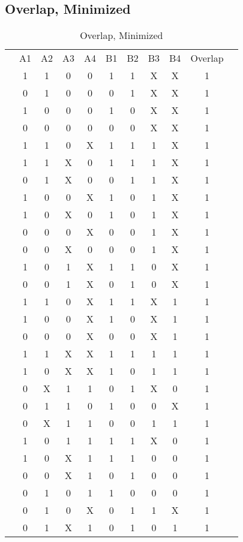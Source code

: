 \documentclass[letterpaper,titlepage,oneside]{article}
\begin{document}
\pagebreak
\subsection*{Overlap, Minimized}
\begin{table}['h']
\begin{tabular}{c|c|c|c|c|c|c|c|c|c|c}
\cline{2-10}
 & A1 & A2 & A3 & A4 & B1 & B2 & B3 & B4 & Overlap &  \\ \cline{2-10}
 & 1 & 1 & 0 & 0 & 1 & 1 & X & X & 1 &  \\
 & 0 & 1 & 0 & 0 & 0 & 1 & X & X & 1 &  \\
 & 1 & 0 & 0 & 0 & 1 & 0 & X & X & 1 &  \\
 & 0 & 0 & 0 & 0 & 0 & 0 & X & X & 1 &  \\
 & 1 & 1 & 0 & X & 1 & 1 & 1 & X & 1 &  \\
 & 1 & 1 & X & 0 & 1 & 1 & 1 & X & 1 &  \\
 & 0 & 1 & X & 0 & 0 & 1 & 1 & X & 1 &  \\
 & 1 & 0 & 0 & X & 1 & 0 & 1 & X & 1 &  \\
 & 1 & 0 & X & 0 & 1 & 0 & 1 & X & 1 &  \\
 & 0 & 0 & 0 & X & 0 & 0 & 1 & X & 1 &  \\
 & 0 & 0 & X & 0 & 0 & 0 & 1 & X & 1 &  \\
 & 1 & 0 & 1 & X & 1 & 1 & 0 & X & 1 &  \\
 & 0 & 0 & 1 & X & 0 & 1 & 0 & X & 1 &  \\
 & 1 & 1 & 0 & X & 1 & 1 & X & 1 & 1 &  \\
 & 1 & 0 & 0 & X & 1 & 0 & X & 1 & 1 &  \\
 & 0 & 0 & 0 & X & 0 & 0 & X & 1 & 1 &  \\
 & 1 & 1 & X & X & 1 & 1 & 1 & 1 & 1 &  \\
 & 1 & 0 & X & X & 1 & 0 & 1 & 1 & 1 &  \\
 & 0 & X & 1 & 1 & 0 & 1 & X & 0 & 1 &  \\
 & 0 & 1 & 1 & 0 & 1 & 0 & 0 & X & 1 &  \\
 & 0 & X & 1 & 1 & 0 & 0 & 1 & 1 & 1 &  \\
 & 1 & 0 & 1 & 1 & 1 & 1 & X & 0 & 1 &  \\
 & 1 & 0 & X & 1 & 1 & 1 & 0 & 0 & 1 &  \\
 & 0 & 0 & X & 1 & 0 & 1 & 0 & 0 & 1 &  \\
 & 0 & 1 & 0 & 1 & 1 & 0 & 0 & 0 & 1 &  \\
 & 0 & 1 & 0 & X & 0 & 1 & 1 & X & 1 &  \\
 & 0 & 1 & X & 1 & 0 & 1 & 0 & 1 & 1 &  \\
\cline{2-10}
\end{tabular}
\caption{Overlap, Minimized}\label{table:Overlap_Minimized}
\end{table}
\end{document}
